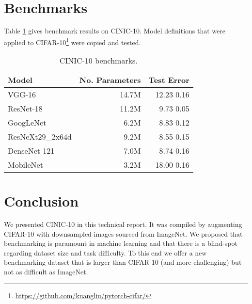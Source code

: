 \documentclass[coverpage]{Style/inftechrep}
\begin{document}
\section{Benchmarks}

Table \ref{tab:bench} gives benchmark results on CINIC-10. Model definitions that were applied to CIFAR-10\footnote{\url{https://github.com/kuangliu/pytorch-cifar/}} were copied and tested. 

\begin{table}[!htbp]
\def\arraystretch{1.5}
\caption{CINIC-10 benchmarks.}\label{tab:bench}
\centering
\begin{tabular}{lrr}
\hline
\textbf{Model}              & \textbf{No. Parameters} & \textbf{Test Error} \\
\hline
VGG-16             & 14.7M          & 12.23  0.16   \\
ResNet-18          & 11.2M          & 9.73  0.05    \\
GoogLeNet          & 6.2M           & 8.83  0.12    \\
ResNeXt29\_2x64d   & 9.2M           & 8.55  0.15    \\
DenseNet-121       & 7.0M           & 8.74  0.16    \\
MobileNet          & 3.2M           & 18.00  0.16   \\
\hline
\end{tabular}

\end{table}

\section{Conclusion}
We presented CINIC-10 in this technical report. It was compiled by augmenting CIFAR-10 with downsampled images sourced from ImageNet. We proposed that benchmarking is paramount in machine learning and that there is a blind-spot regarding dataset size and task difficulty. To this end we offer a new benchmarking dataset that is larger than CIFAR-10 (and more challenging) but not as difficult as ImageNet.






\end{document}
